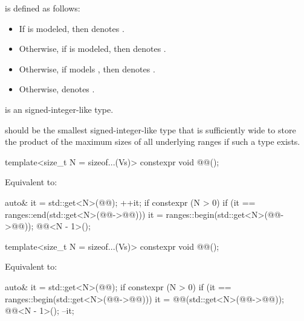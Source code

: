 \pnum
{} is defined as follows:
\begin{itemize}
\item
If 
is modeled,
then  denotes .
\item
Otherwise,
if 
is modeled,
then  denotes .
\item
Otherwise,
if  models ,
then  denotes .
\item
Otherwise,  denotes .
\end{itemize}

\pnum
{} is
an 
signed-integer-like type.

\pnum
\recommended
{} should be
the smallest signed-integer-like type
that is sufficiently wide to store
the product of the maximum sizes of all underlying ranges
if such a type exists.

\pnum
\begin{itemdecl}
template<size_t N = sizeof...(Vs)>
  constexpr void @@();
\end{itemdecl}

\begin{itemdescr}
\pnum
\effects
Equivalent to:
\begin{codeblock}
auto& it = std::get<N>(@@);
++it;
if constexpr (N > 0) {
  if (it == ranges::end(std::get<N>(@@->@@))) {
    it = ranges::begin(std::get<N>(@@->@@));
    @@<N - 1>();
  }
}
\end{codeblock}
\end{itemdescr}

\begin{itemdecl}
template<size_t N = sizeof...(Vs)>
  constexpr void @@();
\end{itemdecl}

\begin{itemdescr}
\pnum
\effects
Equivalent to:
\begin{codeblock}
auto& it = std::get<N>(@@);
if constexpr (N > 0) {
  if (it == ranges::begin(std::get<N>(@@->@@))) {
    it = @@(std::get<N>(@@->@@));
    @@<N - 1>();
  }
}
--it;
\end{codeblock}
\end{itemdescr}


